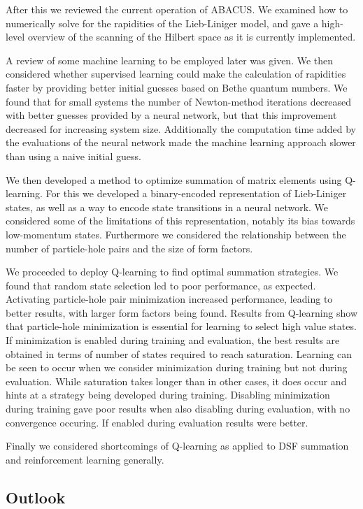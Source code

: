 \documentclass[11pt, a4paper]{report} %
\begin{document}
After this we reviewed the current operation of ABACUS.
We examined how to numerically solve for the rapidities of the Lieb-Liniger model, and gave a high-level overview of the scanning of the Hilbert space as it is currently implemented.

A review of some machine learning to be employed later was given.
We then considered whether supervised learning could make the calculation of rapidities faster by providing better initial guesses based on Bethe quantum numbers.
We found that for small systems the number of Newton-method iterations decreased with better guesses provided by a neural network, but that this improvement decreased for increasing system size.
Additionally the computation time added by the evaluations of the neural network made the machine learning approach slower than using a naive initial guess.

We then developed a method to optimize summation of matrix elements using Q-learning.
For this we developed a binary-encoded representation of Lieb-Liniger states, as well as a way to encode state transitions in a neural network.
We considered some of the limitations of this representation, notably its bias towards low-momentum states.
Furthermore we considered the relationship between the number of particle-hole pairs and the size of form factors.

We proceeded to deploy Q-learning to find optimal summation strategies.
We found that random state selection led to poor performance, as expected.
Activating particle-hole pair minimization increased performance, leading to better results, with larger form factors being found.
Results from Q-learning show that particle-hole minimization is essential for learning to select high value states.
If minimization is enabled during training and evaluation, the best results are obtained in terms of number of states required to reach saturation.
Learning can be seen to occur when we consider minimization during training but not during evaluation.
While saturation takes longer than in other cases, it does occur and hints at a strategy being developed during training.
Disabling minimization during training gave poor results when also disabling during evaluation, with no convergence occuring.
If enabled during evaluation results were better.

Finally we considered shortcomings of Q-learning as applied to DSF summation and reinforcement learning generally.


\subsection{Outlook}
\end{document}

